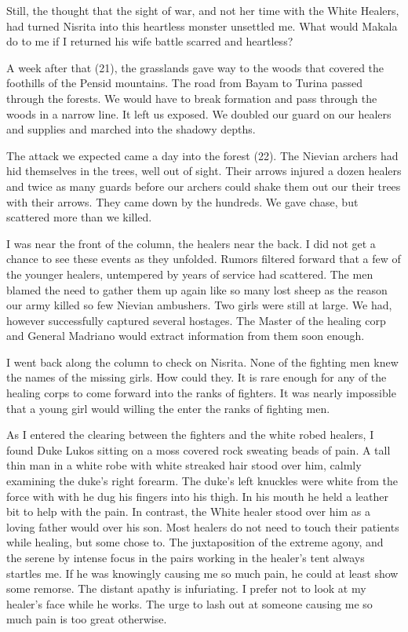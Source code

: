 \documentclass{article}
\begin{document}
Still, the thought that the sight of war, and not her time with the White Healers, had turned Nisrita into this heartless monster unsettled me. What would Makala do to me if I returned his wife battle scarred and heartless?

A week after that (21), the grasslands gave way to the woods that covered the foothills of the Pensid mountains. The road from Bayam to Turina passed through the forests. We would have to break formation and pass through the woods in a narrow line. It left us exposed. We doubled our guard on our healers and supplies and marched into the shadowy depths.

The attack we expected came a day into the forest (22). The Nievian archers had hid themselves in the trees, well out of sight. Their arrows injured a dozen healers and twice as many guards before our archers could shake them out our their trees with their arrows. They came down by the hundreds. We gave chase, but scattered more than we killed. 

I was near the front of the column, the healers near the back. I did not get a chance to see these events as they unfolded. Rumors filtered forward that a few of the younger healers, untempered by years of service had scattered. The men blamed the need to gather them up again like so many lost sheep as the reason our army killed so few Nievian ambushers. Two girls were still at large. We had, however successfully captured several hostages. The Master of the healing corp and General Madriano would extract information from them soon enough.

I went back along the column to check on Nisrita. None of the fighting men knew the names of the missing girls. How could they. It is rare enough for any of the healing corps to come forward into the ranks of fighters. It was nearly impossible that a young girl would willing the enter the ranks of fighting men. 

As I entered the clearing between the fighters and the white robed healers, I found Duke Lukos sitting on a moss covered rock sweating beads of pain. A tall thin man in a white robe with white streaked hair stood over him, calmly examining the duke's right forearm. The duke's left knuckles were white from the force with with he dug his fingers into his thigh. In his mouth he held a leather bit to help with the pain. In contrast, the White healer stood over him as a loving father would over his son. Most healers do not need to touch their patients while healing, but some chose to. The juxtaposition of the extreme agony, and the serene by intense focus in the pairs working in the healer's tent always startles me. If he was knowingly causing me so much pain, he could at least show some remorse. The distant apathy is infuriating. I prefer not to look at my healer's face while he works. The urge to lash out at someone causing me so much pain is too great otherwise.
\end{document}
